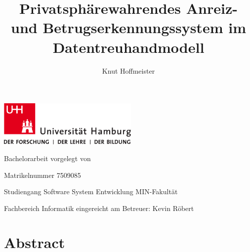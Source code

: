 \documentclass{scrreprt}
\begin{document}
\title{Privatsphärewahrendes Anreiz- und Betrugserkennungssystem im Datentreuhandmodell}
\author{Knut Hoffmeister}

\begin{titlepage}
\includegraphics[width=6.8cm]{up-uhh-logo-u-2010-u-farbe-u-rgb.pdf}
\begin{center}
    \vfill
    \Large Bachelorarbeit
    \vfill
    \makeatletter
    {\Large\textsf{\textbf{\@title}}}
    \makeatother
    \vfill
    vorgelegt von
    \par\bigskip
    \makeatletter
    {\@author}
    \makeatother
    \par
    Matrikelnummer 7509085 \par
    Studiengang Software System Entwicklung
    \vfill
    MIN-Fakultät \par
    Fachbereich Informatik
    \vfill
    \makeatletter
    eingereicht am {\@date}
    \makeatother
    \vfill
    Betreuer: Kevin Röbert
\end{center}
\end{titlepage}

\restoregeometry

\tableofcontents


\chapter*{Abstract}


\end{document}
